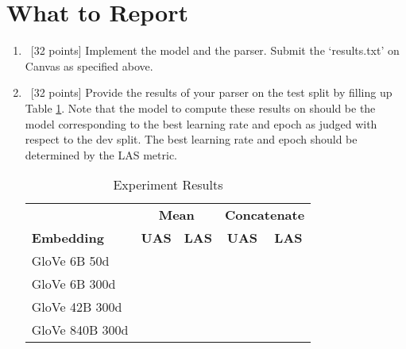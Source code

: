 \section{What to Report}
\begin{enumerate}
    \item~[32 points] Implement the model and the parser. Submit the `results.txt' on Canvas as specified above. 
    \item~[32 points] Provide the results of your parser on the test split by filling up Table \ref{tab:results}. Note that the model to compute these results on should be the model corresponding to the best learning rate and epoch as judged with respect to the dev split. The best learning rate and epoch should be determined by the LAS metric.

    \begin{table}[h!]
    \centering
    \begin{tabular}{@{}lrr|rr@{}}
   
                                        & \multicolumn{2}{|c|}{\textbf{Mean}}                                   & \multicolumn{2}{c}{\textbf{Concatenate}}                            \\ \cmidrule(l){2-5} 
\multicolumn{1}{l|}{\textbf{Embedding}} & \multicolumn{1}{c}{\textbf{UAS}} & \multicolumn{1}{c|}{\textbf{LAS}} & \multicolumn{1}{c}{\textbf{UAS}} & \multicolumn{1}{c}{\textbf{LAS}} \\ \midrule
\multicolumn{1}{l|}{GloVe 6B 50d}       &                                  &                                   &                                  &                                  \\
\multicolumn{1}{l|}{GloVe 6B 300d}      &                                  &                                   &                                  &                                  \\
\multicolumn{1}{l|}{GloVe 42B 300d}     &                                  &                                   &                                  &                                  \\
\multicolumn{1}{l|}{GloVe 840B 300d}    &                                  &                                   &                                  &                                  \\ \bottomrule
\end{tabular}
\caption{Experiment Results}
\label{tab:results}
\end{table}


\end{enumerate}
